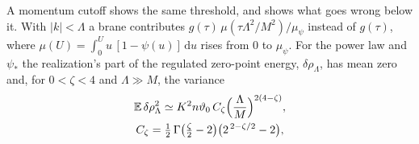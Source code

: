 \documentclass[a4paper,11pt]{article}
\newcommand{\bE}{\mathbb{E}}
\newcommand{\dd}{\mathrm{d}}
\begin{document}
A momentum cutoff shows the same threshold, and shows what goes wrong below it. With $|k|<\Lambda$ a brane contributes $g(\tau)\,\mu(\tau\Lambda^2/M^2)/\mu_\psi$ instead of $g(\tau)$, where $\mu(U)=\int_0^Uu\,[1-\psi(u)]\,\dd u$ rises from $0$ to $\mu_\psi$. For the power law and $\psi_*$ the realization's part of the regulated zero-point energy, $\delta\rho_\Lambda$, has mean zero and, for $0<\zeta<4$ and $\Lambda\gg M$, the variance
\begin{equation}
\label{eq:cutvar}
\begin{gathered}
\bE\,\delta\rho_\Lambda^2\simeq K^2n\vartheta_0\,C_\zeta\Bigl(\frac\Lambda M\Bigr)^{2(4-\zeta)},\\
C_\zeta=\tfrac12\,\Gamma\bigl(\tfrac\zeta2-2\bigr)\bigl(2^{\,2-\zeta/2}-2\bigr),
\end{gathered}
\end{equation}
\end{document}
